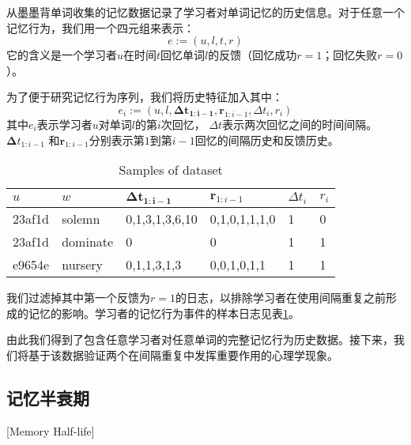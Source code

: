 从墨墨背单词收集的记忆数据记录了学习者对单词记忆的历史信息。对于任意一个记忆行为，我们用一个四元组来表示：
\begin{equation}
e :=(u, l, t, r)
\end{equation}
它的含义是一个学习者$u$在时间$t$回忆单词$l$的反馈（回忆成功$r=1$；回忆失败$r=0$）。

为了便于研究记忆行为序列，我们将历史特征加入其中：
\begin{equation}
e_{i} :=(u, l, \boldsymbol{\Delta t_{1:i-1}}, \boldsymbol r_{1:i-1} , \Delta t_i , r_i)
\end{equation}
其中$e_i$表示学习者$u$对单词$l$的第$i$次回忆， $\Delta t$表示两次回忆之间的时间间隔。 $\boldsymbol \Delta t_{1:i-1}$  和$\boldsymbol r_{1:i-1}$分别表示第$1$到第$i-1$回忆的间隔历史和反馈历史。

\begin{table}[htbp]
    \caption{Samples of dataset}
    \label{tab:raw}
    \vspace{0.5em}\centering\wuhao
    \begin{tabular}{llllll}
    \toprule[1.5pt]
    $u$    & $w$      & $\boldsymbol{\Delta t_{1:i-1}}$ & $\boldsymbol r_{1:i-1}$ & $\Delta t_i$ & $r_i$ \\ 
    \midrule[1pt]
    23af1d & solemn   & 0,1,3,1,3,6,10                  & 0,1,0,1,1,1,0           & 1            & 0 \\
    23af1d & dominate & 0                               & 0                       & 1            & 1 \\
    e9654e & nursery  & 0,1,1,3,1,3                     & 0,0,1,0,1,1             & 1            & 1 \\ \bottomrule[1.5pt]
    \end{tabular}
\end{table}

我们过滤掉其中第一个反馈为$r=1$的日志，以排除学习者在使用间隔重复之前形成的记忆的影响。学习者的记忆行为事件的样本日志见表\ref{tab:raw}。

由此我们得到了包含任意学习者对任意单词的完整记忆行为历史数据。接下来，我们将基于该数据验证两个在间隔重复中发挥重要作用的心理学现象。

\subsection{记忆半衰期}[Memory Half-life]

